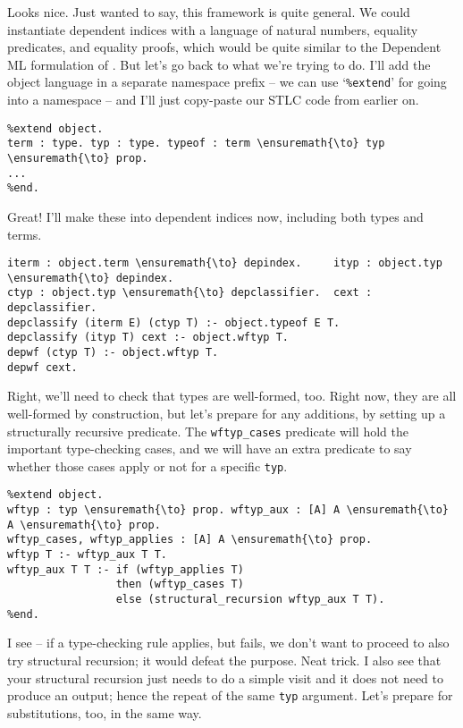 \heroADVISOR{} Looks nice. Just wanted to say, this framework is quite
general. We could instantiate dependent indices with a language of
natural numbers, equality predicates, and equality proofs, which would
be quite similar to the Dependent ML formulation of
\citet{licata2005formulation}. But let's go back to what we're trying to
do. I'll add the object language in a separate namespace prefix -- we
can use `\texttt{\%extend}' for going into a namespace -- and I'll just
copy-paste our STLC code from earlier on.

\begin{verbatim}
%extend object.
term : type. typ : type. typeof : term \ensuremath{\to} typ \ensuremath{\to} prop.
...
%end.
\end{verbatim}

\heroSTUDENT{} Great! I'll make these into dependent indices now, including
both types and terms.

\begin{verbatim}
iterm : object.term \ensuremath{\to} depindex.     ityp : object.typ \ensuremath{\to} depindex.
ctyp : object.typ \ensuremath{\to} depclassifier.  cext : depclassifier.
depclassify (iterm E) (ctyp T) :- object.typeof E T.
depclassify (ityp T) cext :- object.wftyp T.
depwf (ctyp T) :- object.wftyp T.
depwf cext.
\end{verbatim}

\heroADVISOR{} Right, we'll need to check that types are well-formed, too.
Right now, they are all well-formed by construction, but let's prepare
for any additions, by setting up a structurally recursive predicate. The
\texttt{wftyp\_cases} predicate will hold the important type-checking
cases, and we will have an extra predicate to say whether those cases
apply or not for a specific \texttt{typ}.

\begin{verbatim}
%extend object.
wftyp : typ \ensuremath{\to} prop. wftyp_aux : [A] A \ensuremath{\to} A \ensuremath{\to} prop.
wftyp_cases, wftyp_applies : [A] A \ensuremath{\to} prop.
wftyp T :- wftyp_aux T T.
wftyp_aux T T :- if (wftyp_applies T)
                 then (wftyp_cases T)
                 else (structural_recursion wftyp_aux T T).
%end.
\end{verbatim}

\heroSTUDENT{} I see -- if a type-checking rule applies, but fails, we don't
want to proceed to also try structural recursion; it would defeat the
purpose. Neat trick. I also see that your structural recursion just
needs to do a simple visit and it does not need to produce an output;
hence the repeat of the same \texttt{typ} argument. Let's prepare for
substitutions, too, in the same way.

